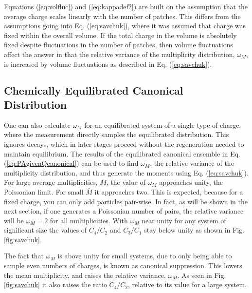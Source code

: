 Equations (\ref{eq:volfluc}) and (\ref{eq:kappadef2}) are built on the assumption that the average charge scales linearly with the number of patches. This differs from the assumptions going into Eq. (\ref{eq:savchuk}), where it was assumed that charge was fixed within the overall volume. If the total charge in the volume is absolutely fixed despite fluctuations in the number of patches, then volume fluctuations affect the answer in that the relative variance of the multiplicity distribution, $\omega_M$, is increased by volume fluctuations as described in Eq. (\ref{eq:savchuk}).

\subsection{Chemically Equilibrated Canonical Distribution}\label{sec:singlecharge}

One can also calculate $\omega_M$ for an equilibrated system of a single type of charge, where the measurement directly samples the equilibrated distribution. This ignores decays, which in later stages proceed without the regeneration needed to maintain equilibrium. The results of the equilibrated canonical ensemble in Eq. (\ref{eq:PAgivenQcanonical}) can be used to find $\omega_M$, the relative variance of the multiplicity distribution, and thus generate the moments using Eq. (\ref{eq:savchuk}). For large average multiplicities, $\overline{M}$, the value of $\omega_M$ approaches unity, the Poissonian limit. For small $\overline{M}$ it approaches two. This is expected, because for a fixed charge, you can only add particles pair-wise. In fact, as will be shown in the next section, if one generates a Poissonian number of pairs, the relative variance will be $\omega_M=2$ for all multiplicities. With $\omega_M$ near unity for any system of significant size the values of $C_4/C_2$ and $C_3/C_1$ stay below unity as shown in Fig. \ref{fig:savchuk}.

The fact that $\omega_M$ is above unity for small systems, due to only being able to sample even numbers of charges, is known as canonical suppression. This lowers the mean multiplicity, and raises the relative variance, $\omega_M$. As seen in Fig. \ref{fig:savchuk} it also raises the ratio $C_4/C_2$, relative to its value for a large system. 

